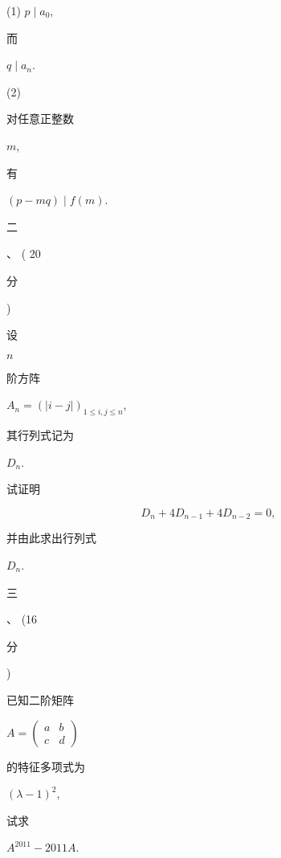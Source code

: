 \documentclass[10pt]{article}
\begin{document}
(1) $p \mid a_{0}$, \begin{CJK}{UTF8}{mj}而\end{CJK} $q \mid a_{n}$.

(2) \begin{CJK}{UTF8}{mj}对任意正整数\end{CJK} $m$, \begin{CJK}{UTF8}{mj}有\end{CJK} $(p-m q) \mid f(m)$.

\begin{CJK}{UTF8}{mj}二\end{CJK}、 ( 20 \begin{CJK}{UTF8}{mj}分\end{CJK}) \begin{CJK}{UTF8}{mj}设\end{CJK} $n$ \begin{CJK}{UTF8}{mj}阶方阵\end{CJK} $A_{n}=(|i-j|)_{1 \leq i, j \leq n}$, \begin{CJK}{UTF8}{mj}其行列式记为\end{CJK} $D_{n}$. \begin{CJK}{UTF8}{mj}试证明\end{CJK}
$$
D_{n}+4 D_{n-1}+4 D_{n-2}=0,
$$
\begin{CJK}{UTF8}{mj}并由此求出行列式\end{CJK} $D_{n}$.

\begin{CJK}{UTF8}{mj}三\end{CJK}、 (16 \begin{CJK}{UTF8}{mj}分\end{CJK}) \begin{CJK}{UTF8}{mj}已知二阶矩阵\end{CJK} $A=\left(\begin{array}{ll}a & b \\ c & d\end{array}\right)$ \begin{CJK}{UTF8}{mj}的特征多项式为\end{CJK} $(\lambda-1)^{2}$, \begin{CJK}{UTF8}{mj}试求\end{CJK} $A^{2011}-2011 A$.
\end{document}

